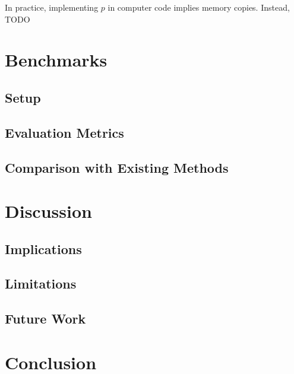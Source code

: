 \documentclass[11pt]{article}
\begin{document}
In practice, implementing \( p \) in computer code implies memory copies. Instead, TODO

\section{Benchmarks}
\subsection{Setup}
\subsection{Evaluation Metrics}
\subsection{Comparison with Existing Methods}

\section{Discussion}
\subsection{Implications}
\subsection{Limitations}
\subsection{Future Work}

\section{Conclusion}
\end{document}
